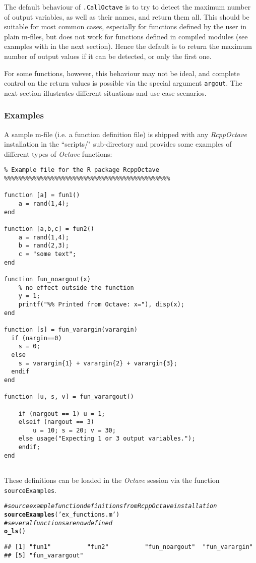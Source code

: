 \documentclass[english,10pt,a4paper]{article}\usepackage[]{graphicx}\usepackage[]{color}
\makeatletter
\newcommand{\hlstr}[1]{\textcolor[rgb]{0.192,0.494,0.8}{#1}}%
\newcommand{\hlcom}[1]{\textcolor[rgb]{0.678,0.584,0.686}{\textit{#1}}}%
\newcommand{\hlstd}[1]{\textcolor[rgb]{0.345,0.345,0.345}{#1}}%
\newcommand{\hlkwd}[1]{\textcolor[rgb]{0.737,0.353,0.396}{\textbf{#1}}}%
\newenvironment{kframe}{%
 \def\at@end@of@kframe{}%
 \ifinner\ifhmode%
  \def\at@end@of@kframe{\end{minipage}}%
  \begin{minipage}{\columnwidth}%
 \fi\fi%
 \def\FrameCommand##1{\hskip\@totalleftmargin \hskip-\fboxsep
 \colorbox{shadecolor}{##1}\hskip-\fboxsep
     \hskip-\linewidth \hskip-\@totalleftmargin \hskip\columnwidth}%
 \MakeFramed {\advance\hsize-\width
   \@totalleftmargin\z@ \linewidth\hsize
   \@setminipage}}%
 {\par\unskip\endMakeFramed%
 \at@end@of@kframe}
\newenvironment{knitrout}{}{} %
\let\proglang=\textit
\let\code=\texttt
\newcommand{\pkgname}[1]{\textit{#1}\xspace}
\newcommand{\octave}{\proglang{Octave}\xspace}
\makeatother
\begin{document}
The default behaviour of \code{.CallOctave} is to try to
detect the maximum number of output variables, as well as their names, and
return them all.
This should be suitable for most common cases, especially for functions
defined by the user in plain m-files, but does not work for functions defined in
compiled modules (see examples with in the next section).
Hence the default is to return the maximum number of output values if it can be
detected, or only the first one.

For some functions, however, this behaviour may not be ideal, and complete
control on the return values is possible via the special argument \code{argout}.
The next section illustrates different situations and use case scenarios.

\subsubsection{Examples}

A sample m-file (i.e. a function definition file) is shipped with any 
\pkgname{RcppOctave} installation in the ``scripts/" sub-directory and provides
some examples of different types of \octave functions:

\begin{Verbatim}[frame=single]
%%%%%%%%%%%%%%%%%%%%%%%%%%%%%%%%%%%%%%%%%%%%%%
% Example file for the R package RcppOctave
%%%%%%%%%%%%%%%%%%%%%%%%%%%%%%%%%%%%%%%%%%%%%%

function [a] = fun1()
	a = rand(1,4);
end

function [a,b,c] = fun2()
	a = rand(1,4);
	b = rand(2,3);
	c = "some text";
end

function fun_noargout(x) 
	% no effect outside the function
	y = 1;
	printf("%% Printed from Octave: x="), disp(x);
end

function [s] = fun_varargin(varargin)
  if (nargin==0)
	s = 0;
  else
	s = varargin{1} + varargin{2} + varargin{3};
  endif
end

function [u, s, v] = fun_varargout()

	if (nargout == 1) u = 1; 
	elseif (nargout == 3)
		u = 10; s = 20; v = 30; 
	else usage("Expecting 1 or 3 output variables.");
	endif; 
end


\end{Verbatim}

These definitions can be loaded in the \octave session via the function
\code{sourceExamples}.

\begin{knitrout}
\color{fgcolor}\begin{kframe}
\begin{alltt}
\hlcom{# source example function definitions from RcppOctave installation}
\hlkwd{sourceExamples}\hlstd{(}\hlstr{'ex_functions.m'}\hlstd{)}
\hlcom{# several functions are now defined}
\hlkwd{o_ls}\hlstd{()}
\end{alltt}
\begin{verbatim}
## [1] "fun1"          "fun2"          "fun_noargout"  "fun_varargin" 
## [5] "fun_varargout"
\end{verbatim}
\end{kframe}
\end{knitrout}
\end{document}
